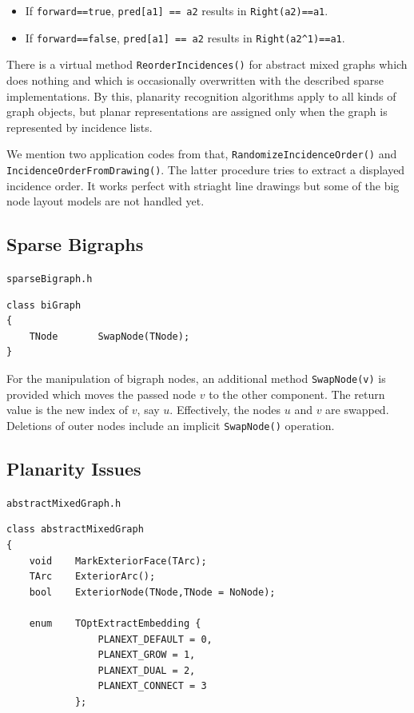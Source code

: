 \documentclass[a4paper,11pt,twoside]{book}
\begin{document}
\begin{multicols}{2}
\begin{itemize}
\item If \verb/forward==true/, \verb/pred[a1] == a2/ results in \verb/Right(a2)==a1/.
\item If \verb/forward==false/, \verb/pred[a1] == a2/ results in \verb/Right(a2^1)==a1/.
\end{itemize}
There is a virtual method \verb/ReorderIncidences()/ for abstract mixed graphs
which does nothing and which is occasionally overwritten with the described sparse
implementations. By this, planarity recognition algorithms apply to all kinds of
graph objects, but planar representations are assigned only when the graph is
represented by incidence lists.

We mention two application codes from that, \verb/RandomizeIncidenceOrder()/ and
\verb/IncidenceOrderFromDrawing()/. The latter procedure tries to extract a
displayed incidence order. It works perfect with striaght line drawings but some
of the big node layout models are not handled yet.


\subsection{Sparse Bigraphs}
\label{slb_spsbig}
\myinclude\verb/sparseBigraph.h/
\begin{mymethods}
\begin{verbatim}
class biGraph
{
    TNode       SwapNode(TNode);
}
\end{verbatim}
\end{mymethods}
For the manipulation of bigraph nodes, an additional method \verb/SwapNode(v)/
is provided which moves the passed node $v$ to the other component. The return
value is the new index of $v$, say $u$. Effectively, the nodes $u$ and $v$ are
swapped. Deletions of outer nodes include an implicit \verb/SwapNode()/
operation.


\subsection{Planarity Issues}
\label{slb_planarity1}
\myinclude\verb/abstractMixedGraph.h/
\begin{mymethods}
\begin{verbatim}
class abstractMixedGraph
{
    void    MarkExteriorFace(TArc);
    TArc    ExteriorArc();
    bool    ExteriorNode(TNode,TNode = NoNode);

    enum    TOptExtractEmbedding {
                PLANEXT_DEFAULT = 0,
                PLANEXT_GROW = 1,
                PLANEXT_DUAL = 2,
                PLANEXT_CONNECT = 3
            };


\end{verbatim}
\end{mymethods}
\end{multicols}
\end{document}
